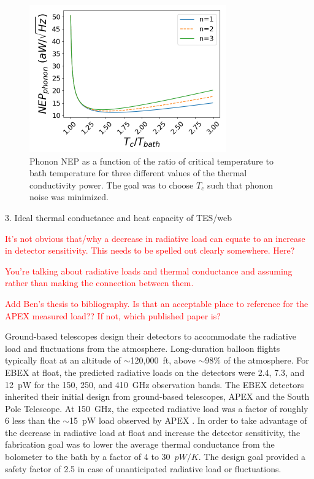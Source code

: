 \begin{figure}[htp]
\begin{center}
\includegraphics[height=2.5in]{figures/phonon_nep_vs_temperature.png}
\caption{Phonon \ac{NEP} as a function of the ratio of critical temperature to bath temperature for three different values of the thermal conductivity power. The goal was to choose $T_{c}$ such that phonon noise was minimized.
\label{fig:phonon_nep_vs_temps} }
\end{center}
\end{figure}

3. Ideal thermal conductance and heat capacity of TES/web 

\textcolor{red}{It's not obvious that/why a decrease in radiative load can equate to an increase in detector sensitivity. This needs to be spelled out clearly somewhere. Here?}

\textcolor{red}{You're talking about radiative loads and thermal conductance and assuming rather than making the connection between them.}

\textcolor{red}{Add Ben's thesis to bibliography. Is that an acceptable place to reference for the APEX measured load?? If not, which published paper is?}

Ground-based telescopes design their detectors to accommodate the radiative load and fluctuations from the atmosphere. 
Long-duration balloon flights typically float at an altitude of $\sim$120,000~ft, above $\sim$98\% of the atmosphere. 
For \ac{EBEX} at float, the predicted radiative loads on the detectors were 2.4, 7.3, and 12~pW for the 150, 250, and 410~GHz observation bands. 
The \ac{EBEX} detectors inherited their initial design from ground-based telescopes, \ac{APEX} and the South Pole Telescope. 
At 150~GHz, the expected radiative load was a factor of roughly 6 less than the $\sim$15~pW load observed by \ac{APEX} \cite{westbrook_thesis}. 
In order to take advantage of the decrease in radiative load at float and increase the detector sensitivity, the fabrication goal was to lower the average thermal conductance from the bolometer to the bath by a factor of 4 to 30~$pW/K$. 
The design goal provided a safety factor of 2.5 in case of unanticipated radiative load or fluctuations.

